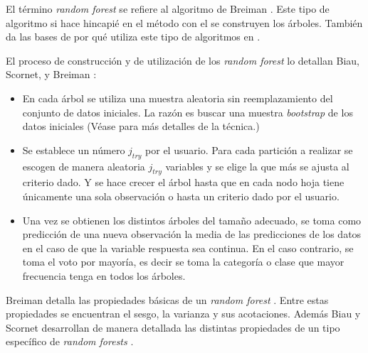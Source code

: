 \noindent El término \emph{random forest} se refiere al algoritmo de Breiman  \cite{Breiman 2001}. Este tipo de algoritmo si hace hincapié en el  método con el se construyen los árboles. También da las bases de por qué utiliza este tipo de algoritmos en \cite{Breiman 1996}.

\noindent El proceso de construcción y de utilización de los \emph{random forest} lo detallan Biau,  Scornet, y Breiman \cite{Biau 2016,Breiman 2004a} :
\begin{itemize}
\item En cada árbol se utiliza una muestra aleatoria sin reemplazamiento del conjunto de datos iniciales. La razón es buscar una muestra \emph{bootstrap} de los datos iniciales (Véase \cite{Hesterberg 2011} para más detalles de la técnica.)
\item Se establece un número $j_{try}$ por el usuario. Para cada partición a realizar se escogen de manera aleatoria $j_{try}$ variables y se elige la que más se ajusta al criterio dado. Y se hace crecer el árbol hasta que en cada nodo hoja tiene únicamente una sola observación o hasta un criterio dado por el usuario. 
 
\item Una vez se obtienen los distintos árboles del tamaño adecuado, se toma como predicción de una nueva observación la media de las predicciones de los datos en el caso de que la variable respuesta sea continua. En el caso contrario, se toma el voto por mayoría, es decir se toma la categoría o clase que mayor frecuencia tenga en todos los árboles. 
\end{itemize}

\noindent Breiman detalla las propiedades básicas de un \emph{random forest}  \cite {Breiman 2004a}. Entre estas propiedades se encuentran el sesgo, la varianza y sus acotaciones. Además Biau  y Scornet desarrollan de manera detallada las distintas propiedades de un tipo específico de \emph{random forests} \cite{Biau 2016}.

